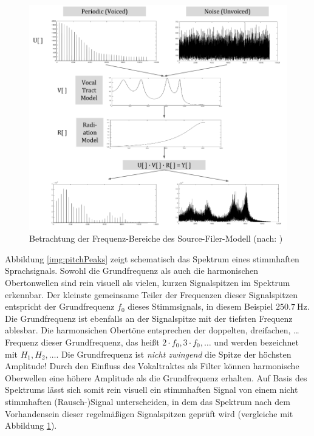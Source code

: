 \begin{figure}[h]
	\centering
	\includegraphics[width=1\textwidth]{bilder/sourceFilterSpectra.png}
	\caption{Betrachtung der Frequenz-Bereiche des Source-Filer-Modell (nach: \cite[Source Estimation, S. 3]{ricardo_ceps})}
	\label{img:sourceFilerSpectra}
\end{figure}	

Abbildung \ref{img:pitchPeaks} zeigt schematisch das Spektrum eines stimmhaften Sprachsignals. Sowohl die Grundfrequenz als auch die harmonischen Obertonwellen sind rein visuell als \glqq vielen, kurzen Signalspitzen\grqq{} im Spektrum erkennbar. Der kleinste gemeinsame Teiler der Frequenzen dieser Signalspitzen entspricht der Grundfrequenz  $f_0$ dieses Stimmsignals, in diesem Beispiel $\SI{250.7}{\hertz}$. Die Grundfrequenz ist ebenfalls an der Signalspitze mit der tiefsten Frequenz ablesbar. Die harmonsichen Obertöne entsprechen der doppelten, dreifachen, \ldots Frequenz dieser Grundfrequenz, das heißt $2\cdot f_0, 3\cdot f_0, \ldots$ und werden bezeichnet mit $H_1, H_2, \ldots$. Die Grundfrequenz ist \emph{nicht zwingend} die Spitze der höchsten Amplitude! Durch den Einfluss des Vokaltraktes als Filter können harmonische Oberwellen eine höhere Amplitude als die Grundfrequenz erhalten. Auf Basis des Spektrums lässt sich somit rein visuell ein stimmhaften Signal von einem nicht stimmhaften (Rausch-)Signal unterscheiden, in dem das Spektrum nach dem Vorhandensein dieser regelmäßigen Signalspitzen geprüft wird (vergleiche mit Abbildung \ref{img:sourceFilerSpectra}).\cite[S. 52 - 53]{sprachverarbeitung}

